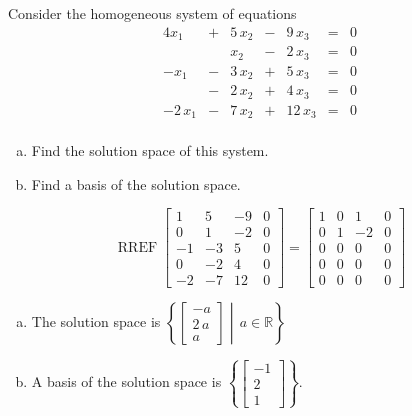 
\begin{exerciseStatement}


Consider the homogeneous system of equations 
\begin{alignat*}{4} x_{1} &+& 5 \, x_{2} &-& 9 \, x_{3} &=& 0 \\ & & x_{2} &-& 2 \, x_{3} &=& 0 \\-x_{1} &-& 3 \, x_{2} &+& 5 \, x_{3} &=& 0 \\ &-& 2 \, x_{2} &+& 4 \, x_{3} &=& 0 \\-2 \, x_{1} &-& 7 \, x_{2} &+& 12 \, x_{3} &=& 0 \\ \end{alignat*}
            


\begin{enumerate}[(a)]
\item  Find the solution space of this system.
\item  Find a basis of the solution space.
\end{enumerate}
    
\end{exerciseStatement}
    
\begin{exerciseAnswer} 


\[\operatorname{RREF} \left[\begin{array}{ccc|c}
1 & 5 & -9 & 0 \\
0 & 1 & -2 & 0 \\
-1 & -3 & 5 & 0 \\
0 & -2 & 4 & 0 \\
-2 & -7 & 12 & 0
\end{array}\right] = \left[\begin{array}{ccc|c}
1 & 0 & 1 & 0 \\
0 & 1 & -2 & 0 \\
0 & 0 & 0 & 0 \\
0 & 0 & 0 & 0 \\
0 & 0 & 0 & 0
\end{array}\right] \]


\begin{enumerate}[(a)]
\item The solution space is \( \left\{ \left[\begin{array}{c}
-a \\
2 \, a \\
a
\end{array}\right] \middle|\,a\in\mathbb{R}\right\} \)
\item A basis of the solution space is \( \left\{ \left[\begin{array}{c}
-1 \\
2 \\
1
\end{array}\right] \right\} \).
\end{enumerate}
    
\end{exerciseAnswer}
    
